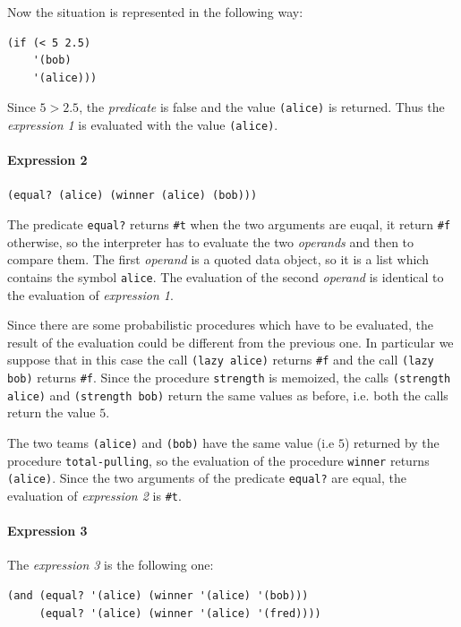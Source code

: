\begin{itemize}
        Now the situation is represented in the following way:
        \begin{lstlisting}[caption={Expression to be evaluated after evaluating \texttt{(total-pulling \textquotesingle bob)}}, captionpos=b]
(if (< 5 2.5)
    '(bob)
    '(alice)))  
        \end{lstlisting}
        Since $5 > 2.5$, the \textit{predicate} is false and the value \texttt{\textquotesingle(alice)} is returned. Thus the \textit{expression 1}
        is evaluated with the value \texttt{\textquotesingle(alice)}.


        \paragraph*{Expression 2} \texttt{(equal? \textquotesingle(alice) (winner \textquotesingle(alice) \textquotesingle(bob)))}

        The predicate \texttt{equal?} returns \texttt{\#t} when the two arguments are euqal, it return \texttt{\#f} otherwise, so
        the interpreter has to evaluate the two \textit{operands} and then to compare them. The first \textit{operand} is a quoted
        data object, so it is a list which contains the symbol \texttt{\textquotesingle alice}. The evaluation of the second \textit{operand} is
        identical to the evaluation of \textit{expression 1}.
        
        Since there are some probabilistic procedures which have to be evaluated, the result of the evaluation could be different 
        from the previous one. In particular we suppose that in this case the call \texttt{(lazy \textquotesingle alice)} returns \texttt{\#f} and 
        the call \texttt{(lazy \textquotesingle bob)} returns \texttt{\#f}.
        Since the procedure \texttt{strength} is memoized, the calls \texttt{(strength \textquotesingle alice)} and \texttt{(strength \textquotesingle bob)} return
        the same values as before, i.e. both the calls return the value $5$.
        
        The two teams \texttt{\textquotesingle (alice)} and \texttt{\textquotesingle (bob)} have the same value (i.e $5$) returned by the procedure 
        \texttt{total-pulling}, so the evaluation of the procedure \texttt{winner} returns \texttt{\textquotesingle (alice)}.
        Since the two arguments of the predicate \texttt{equal?} are equal, the evaluation of \textit{expression 2} is \texttt{\#t}.


        \paragraph*{Expression 3} The \textit{expression 3} is the following one: 
        \begin{lstlisting}
(and (equal? '(alice) (winner '(alice) '(bob)))
     (equal? '(alice) (winner '(alice) '(fred))))
        \end{lstlisting}


\end{itemize}
